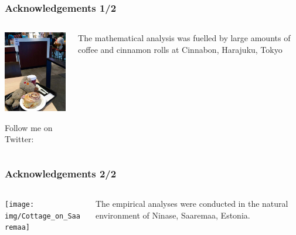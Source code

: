 \begin{frame}
  \frametitle{Acknowledgements 1/2}

  \ungap[1]
  \begin{columns}[T]
    \begin{column}{55mm}
      \includegraphics[width=52mm]{img/ratti_cinnamon_rolls}
      
      \scriptsize
      Follow me on Twitter: 
    \end{column}
    \begin{column}{50mm}
      The mathematical analysis was fuelled by large amounts of coffee and cinnamon rolls at Cinnabon, Harajuku, Tokyo

    \end{column}

  \end{columns}
\end{frame}

\begin{frame}
  \frametitle{Acknowledgements 2/2}

  \ungap[1]
  \begin{columns}[T]
    \begin{column}{70mm}
      \texttt{[image: img/Cottage\_on\_Saaremaa]}
    \end{column}
    \begin{column}{40mm}
      The empirical analyses were conducted in the natural environment of Ninase, Saaremaa, Estonia.
    \end{column}

  \end{columns}
\end{frame}

